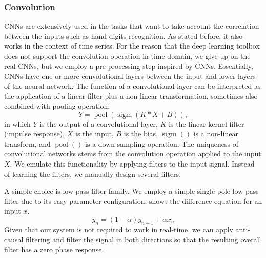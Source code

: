 \documentclass{article}
\DeclareMathOperator*{\pool}{pool}
\DeclareMathOperator*{\sigm}{sigm}
\begin{document}
\subsubsection{Convolution}
CNNs are extensively used in the tasks that want to take account the correlation between the inputs such as hand digits recognition. As stated before, it also works in the context of time series. For the reason that the deep learning toolbox does not support the convolution operation in time domain, we give up on the real CNNs, but we employ a pre-processing step inspired by CNNs. Essentially, CNNs have one or more convolutional layers between the input and lower layers of the neural network. The function of a convolutional layer can be interpreted as the application of a linear filter plus a non-linear transformation, sometimes also combined with pooling operation:
\begin{equation}\label{Covulution}
Y = \pool(\sigm(K \ast X + B)), 
\end{equation}
in which $Y$ is the output of a convolutional layer, $K$ is the linear kernel filter (impulse response), $X$ is the input, $B$ is the bias, $\sigm()$ is a non-linear transform, and $\pool()$ is a down-sampling operation. The uniqueness of convolutional networks stems from the convolution operation applied to the input $X$. We emulate this functionality by applying filters to the input signal. Instead of learning the filters, we manually design several filters.

A simple choice is low pass filter family. 
We employ a simple single pole low pass filter due to its easy parameter configuration.  shows the difference equation  for an input $x$.
\begin{equation}\label{IIR}
y_{n} = (1-\alpha) y_{n-1} + \alpha x_{n}
\end{equation}
Given that our system is not required to work in real-time, we can apply anti-causal filtering and filter the signal in both directions so that the resulting overall filter has a zero phase response.
\end{document}
